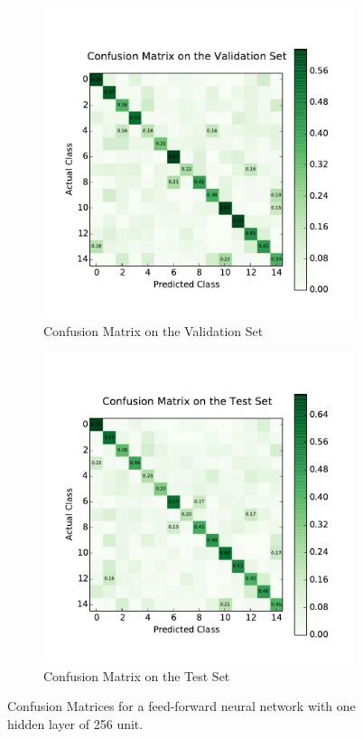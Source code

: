 \begin{figure}
	\centering
	\begin{subfigure}[b]{0.45\linewidth}
		\centering
		\includegraphics[width=\linewidth]{images/1/cm_valid.pdf}
		\caption{Confusion Matrix on the Validation Set}
	\end{subfigure}
	\hfill
	\begin{subfigure}[b]{0.45\linewidth}
		\centering
		\includegraphics[width=\linewidth]{images/1/cm_test.pdf}
		\caption{Confusion Matrix on the Test Set}
	\end{subfigure}
	\caption{Confusion Matrices for a feed-forward neural network with one hidden layer of 256 unit.}
	\label{shrine0_mat}
\end{figure}
